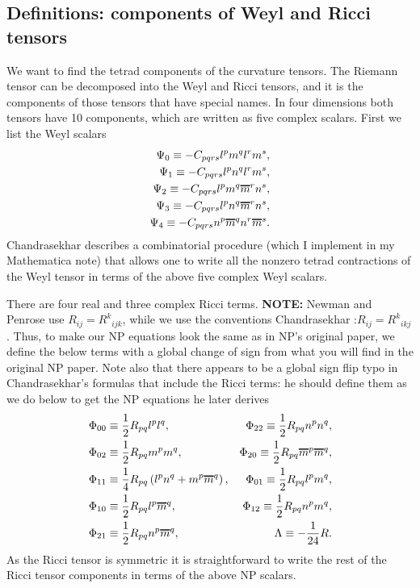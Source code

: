 \documentclass[12pt]{report}
\newcommand*\oline[1]{%
   \vbox{%
     \hrule height 1pt%
     \kern0.25ex%
     \hbox{%
       \ifmmode#1\else\ensuremath{#1}\fi%
     }
   }
}
\begin{document}
\subsection{Definitions: components of Weyl and Ricci tensors}
\label{sec:def_Weyl_Ricci_tensors}
	We want to find the tetrad components of the curvature tensors. The
Riemann tensor can be decomposed into the Weyl and Ricci tensors, and it
is the components of those tensors that have special names. In four dimensions
both tensors have 10 components, which are written as five complex scalars.
First we list the Weyl scalars 
\begin{align}
\begin{aligned}
	\Psi_0
	\equiv
	-C_{pqrs}l^pm^ql^rm^s
	, \\
	\Psi_1
	\equiv
	-C_{pqrs}l^pn^ql^rm^s
	, \\
	\Psi_2
	\equiv
	-C_{pqrs}l^pm^q\oline{m}^rn^s
	, \\
	\Psi_3
	\equiv
	-C_{pqrs}l^pn^q\oline{m}^rn^s
	, \\
	\Psi_4
	\equiv
	-C_{pqrs}n^p\oline{m}^qn^r\oline{m}^s
	.
\end{aligned}
\end{align} 
	Chandrasekhar \cite{Chandrasekhar_bh_book}
describes a combinatorial procedure
(which I implement in my Mathematica note) that allows one to
write all the nonzero tetrad contractions of the Weyl
tensor in terms of the above five complex Weyl scalars.

	There are four real and three complex
Ricci terms. {\bf NOTE:}
Newman and Penrose \cite{Newman_Penrose_paper} use
$R_{ij}=R^k{}_{ijk}$, while we use the conventions Chandrasekhar
\cite{Chandrasekhar_bh_book}:$R_{ij}=R^k{}_{ikj}$.
Thus, to make our NP equations
look the same as in NP's original paper, we define the below
terms with a global change of sign from what you
will find in the original NP paper.
Note also that there appears to be a global
sign flip typo in Chandrasekhar's formulas that include the Ricci terms:
he should define them as we do below to get the NP equations he later derives
\begin{align}
\begin{aligned} 
	&
	\Phi_{00}
	\equiv
	\frac{1}{2}R_{pq}l^pl^q
	, &
	\Phi_{22}
	\equiv
	\frac{1}{2}R_{pq}n^pn^q
	, \\
	&
	\Phi_{02}
	\equiv
	\frac{1}{2}R_{pq}m^pm^q
	, &
	\Phi_{20}
	\equiv
	\frac{1}{2}R_{pq}\oline{m}^p\oline{m}^q
	, \\
	&
	\Phi_{11}
	\equiv
	\frac{1}{4}R_{pq}\left(
		l^pn^q
	+	m^p\oline{m}^q
	\right)
	, &
	\Phi_{01}
	\equiv
	\frac{1}{2}R_{pq}l^pm^q
	, \\
	&
	\Phi_{10}
	\equiv
	\frac{1}{2}R_{pq}l^p\oline{m}^q
	, &
	\Phi_{12}
	\equiv
	\frac{1}{2}R_{pq}n^pm^q
	, \\
	&
	\Phi_{21}
	\equiv
	\frac{1}{2}R_{pq}n^p\oline{m}^q
	, & 
	\Lambda
	\equiv
	-\frac{1}{24}R
	.
\end{aligned}
\end{align} 
	As the Ricci tensor is symmetric it is straightforward to write
the rest of the Ricci tensor components in terms of the above NP scalars. 
\end{document}

